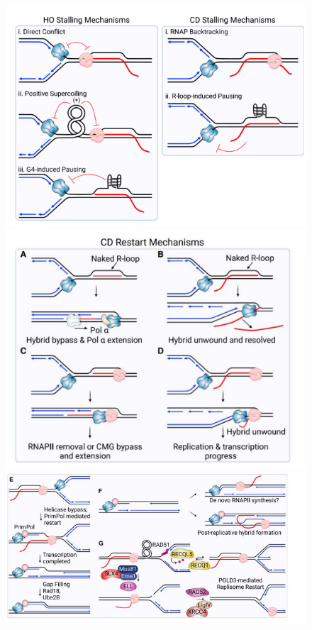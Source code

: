 \begin{figure}[H]
		\centering
 		\includegraphics[scale = 0.4]{../_resources/78ecdeb0787ab87f0b7124de9a54c389.png}
        \includegraphics[scale = 0.4]{../_resources/5b8301b5dc4e4bdae69a035b325c110d.png}
        \includegraphics[scale = 0.4]{../_resources/7488f37079b01dd2811223bd1a82f7fb.png}
		\label{fig:senescence}
	\end{figure}
	
